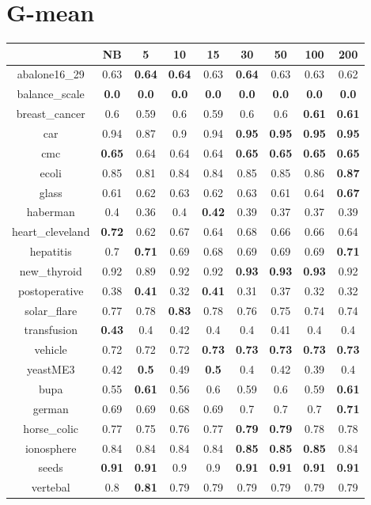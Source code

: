 \documentclass{article}%
\begin{document}
%
\section*{G{-}mean}%
\begin{tabular}{c|cccccccc}%
\hline%
&NB&5&10&15&30&50&100&200\\%
\hline%
abalone16\_29&0.63&\textbf{0.64}&\textbf{0.64}&0.63&\textbf{0.64}&0.63&0.63&0.62\\%
\hline%
balance\_scale&\textbf{0.0}&\textbf{0.0}&\textbf{0.0}&\textbf{0.0}&\textbf{0.0}&\textbf{0.0}&\textbf{0.0}&\textbf{0.0}\\%
\hline%
breast\_cancer&0.6&0.59&0.6&0.59&0.6&0.6&\textbf{0.61}&\textbf{0.61}\\%
\hline%
car&0.94&0.87&0.9&0.94&\textbf{0.95}&\textbf{0.95}&\textbf{0.95}&\textbf{0.95}\\%
\hline%
cmc&\textbf{0.65}&0.64&0.64&0.64&\textbf{0.65}&\textbf{0.65}&\textbf{0.65}&\textbf{0.65}\\%
\hline%
ecoli&0.85&0.81&0.84&0.84&0.85&0.85&0.86&\textbf{0.87}\\%
\hline%
glass&0.61&0.62&0.63&0.62&0.63&0.61&0.64&\textbf{0.67}\\%
\hline%
haberman&0.4&0.36&0.4&\textbf{0.42}&0.39&0.37&0.37&0.39\\%
\hline%
heart\_cleveland&\textbf{0.72}&0.62&0.67&0.64&0.68&0.66&0.66&0.64\\%
\hline%
hepatitis&0.7&\textbf{0.71}&0.69&0.68&0.69&0.69&0.69&\textbf{0.71}\\%
\hline%
new\_thyroid&0.92&0.89&0.92&0.92&\textbf{0.93}&\textbf{0.93}&\textbf{0.93}&0.92\\%
\hline%
postoperative&0.38&\textbf{0.41}&0.32&\textbf{0.41}&0.31&0.37&0.32&0.32\\%
\hline%
solar\_flare&0.77&0.78&\textbf{0.83}&0.78&0.76&0.75&0.74&0.74\\%
\hline%
transfusion&\textbf{0.43}&0.4&0.42&0.4&0.4&0.41&0.4&0.4\\%
\hline%
vehicle&0.72&0.72&0.72&\textbf{0.73}&\textbf{0.73}&\textbf{0.73}&\textbf{0.73}&\textbf{0.73}\\%
\hline%
yeastME3&0.42&\textbf{0.5}&0.49&\textbf{0.5}&0.4&0.42&0.39&0.4\\%
\hline%
bupa&0.55&\textbf{0.61}&0.56&0.6&0.59&0.6&0.59&\textbf{0.61}\\%
\hline%
german&0.69&0.69&0.68&0.69&0.7&0.7&0.7&\textbf{0.71}\\%
\hline%
horse\_colic&0.77&0.75&0.76&0.77&\textbf{0.79}&\textbf{0.79}&0.78&0.78\\%
\hline%
ionosphere&0.84&0.84&0.84&0.84&\textbf{0.85}&\textbf{0.85}&\textbf{0.85}&0.84\\%
\hline%
seeds&\textbf{0.91}&\textbf{0.91}&0.9&0.9&\textbf{0.91}&\textbf{0.91}&\textbf{0.91}&\textbf{0.91}\\%
\hline%
vertebal&0.8&\textbf{0.81}&0.79&0.79&0.79&0.79&0.79&0.79\\%
\hline%
\end{tabular}

%
\end{document}

